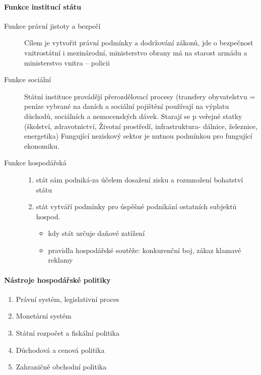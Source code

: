 \paragraph*{Funkce institucí státu}
\begin{description}
    \item[Funkce právní jistoty a bezpečí] Cílem je vytvořit právní podmínky a dodržování zákonů, jde o bezpečnost vnitrostátní i mezinárodní, ministerstvo obrany má na starost armádu a ministerstvo vnitra -- policii
    \item[Funkce sociální] Státní instituce provádějí přerozdělovací procesy (transfery obyvatelstvu = peníze vybrané na daních a sociální pojištění používají na výplatu důchodů, sociálních a nemocenských dávek. Starají se p veřejné statky (školství, zdravotnictví, Životní prostředí, infrastruktura-
dálnice, železnice, energetika) Fungující neziskový sektor je nutnou podmínkou pro fungující ekonomiku.
    \item[Funkce hospodářská]
        \begin{enumerate}
            \item stát sám podniká-za účelem dosažení zisku a rozmnožení bohatství státu
            \item stát vytváří podmínky pro úspěšné podnikání ostatních subjektů hospod.
                \begin{itemize}
                    \item kdy stát určuje daňové zatížení
                    \item pravidla hospodářské soutěže: konkurenční boj, zákaz klamavé reklamy
                \end{itemize}
        \end{enumerate}
\end{description}

\paragraph*{Nástroje hospodářské politiky}
\begin{enumerate}
    \item Právní systém, legislativní proces
    \item Monetární systém
    \item Státní rozpočet a fiskální politika
    \item Důchodová a cenová politika
    \item Zahraničně obchodní politika
\end{enumerate}


